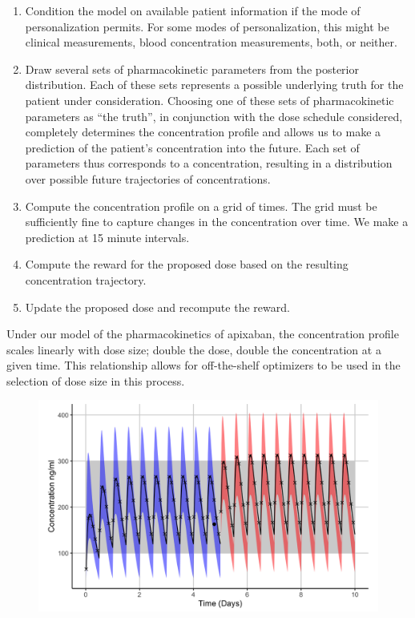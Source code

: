 \begin{enumerate}
	\item Condition the model on available patient information if the mode of personalization permits. For some modes of personalization, this might be clinical measurements, blood concentration measurements, both, or neither.
	
	\item Draw several sets of pharmacokinetic parameters from the posterior distribution. Each of these sets represents a possible underlying truth for the patient  under consideration. Choosing one of these sets of pharmacokinetic parameters as ``the truth'', in conjunction with the dose schedule considered, completely determines the concentration profile and allows us to make a prediction of the patient's concentration into the future. Each set of parameters thus corresponds to a concentration, resulting in a distribution over possible future trajectories of concentrations.
	
	\item Compute the concentration profile on a grid of times.  The grid must be sufficiently fine to capture changes in the concentration over time.  We make a prediction at 15 minute intervals.
	
	\item Compute the reward for the proposed dose based on the resulting concentration trajectory.
	
	\item Update the proposed dose and recompute the reward.
\end{enumerate}

Under our model of the pharmacokinetics of apixaban, the concentration profile scales linearly with dose size; double the dose, double the concentration at a given time.  This relationship allows for off-the-shelf optimizers to be used in the selection of dose size in this process.

\begin{figure}
	\centering
	\includegraphics[width=0.85\linewidth]{figures/viz_of_process.png}
	\caption{}
	\label{fig:processfiguresingle}
\end{figure}

